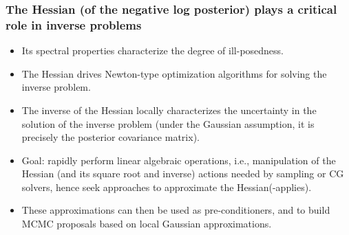 \documentclass[10pt,final,xcolor=dvipsnames]{beamer}
\begin{document}
%
\begin{frame}
  \frametitle{The Hessian (of the negative log posterior) plays a
    critical role in inverse problems}
  \begin{itemize}
  \item Its spectral properties characterize the degree of
    ill-posedness.
  \item The Hessian drives Newton-type optimization algorithms for
    solving the inverse problem.
  \item The inverse of the Hessian locally characterizes the uncertainty
    in the solution of the inverse problem (under the Gaussian
    assumption, it is precisely the posterior covariance matrix).
  \item \alert{Goal:} rapidly perform linear algebraic operations, i.e.,
    manipulation of the Hessian (and its square root and inverse)
    actions needed by sampling or CG solvers, hence \alert{seek
      approaches to approximate the Hessian(-applies)}.
  \item These approximations can then be used as
    \alert{pre-conditioners}, and to \alert{build MCMC proposals} based
    on local Gaussian approximations.
  \end{itemize}
\end{frame}
\end{document}
